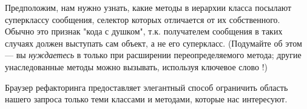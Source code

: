 \documentclass[a4paper,10pt,twoside]{book}
\begin{document}
{%
Предположим, нам нужно узнать, какие методы в иерархии класса  посылают суперклассу сообщения, селектор которых отличается от их собственного.
Обычно это признак "кода с душком", т.к. получателем сообщения в таких случаях должен выступать сам объект, а не его суперкласс. (Подумайте об этом --- вы \emph{нуждаетесь} в \super только при расширении переопределяемого метода; другие унаследованные методы можно вызывать, используя ключевое слово \self!)

Браузер рефакторинга предоставляет элегантный способ ограничить область нашего запроса только теми классами и методами, которые нас интересуют.

\dothis{Откройте браузер на классе \ct{Collection}.
\actclick на имени класса и выберете \menu{refactoring scope>subclasses with}.
Откроется новое окно браузера с окружением, ограниченным иерархией класса \ct{Collection}.
Внутри этой ограниченной области выберете \menu{refactoring scope>super-sends}, чтобы открыть новое окружение со всеми методами внутри иерархии класса \ct{Collectuon}, посылающими сообщения суперклассу.
Теперь \click на любом методе и выберете \menu{refactor>code critics}.
Затем перейдите к \menu{Lint checks>Possible bugs>Sends different super message} и \actclick, чтобы выбрать \menu{browse}.}

}
\end{document}
